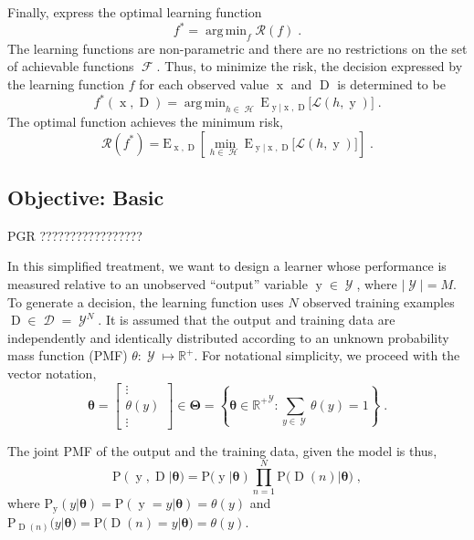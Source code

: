 \documentclass[12pt]{report}
\DeclareMathOperator*{\argmin}{arg\,min}
\DeclareMathOperator{\xrm}{\mathrm{x}}
\DeclareMathOperator{\yrm}{\mathrm{y}}
\DeclareMathOperator{\Drm}{\mathrm{D}}
\DeclareMathOperator{\Ycal}{\mathcal{Y}}
\DeclareMathOperator{\Dcal}{\mathcal{D}}
\DeclareMathOperator{\Hcal}{\mathcal{H}}
\DeclareMathOperator{\Fcal}{\mathcal{F}}
\begin{document}
Finally, express the optimal learning function
\begin{equation}
f^* = \argmin_{f} \mathcal{R}(f) \;.
\end{equation}
The learning functions are non-parametric and there are no restrictions on the set of achievable functions $\Fcal$. Thus, to minimize the risk, the decision expressed by the learning function $f$ for each observed value $\xrm$ and $\Drm$ is determined to be
\begin{equation} \label{f_opt_xD}
f^*(\xrm,\Drm) = \argmin_{h \in \Hcal} \text{E}_{\yrm | \xrm,\Drm}\big[ \mathcal{L}(h,\yrm) \big] \;.
\end{equation}
The optimal function achieves the minimum risk,
\begin{equation} \label{risk_min_IO}
\mathcal{R}(f^*) = \text{E}_{\xrm,\Drm} \left[ \min_{h \in \Hcal} \text{E}_{\yrm | \xrm,\Drm}\big[ \mathcal{L}(h,\yrm) \big] \right] \;.
\end{equation}




\subsection{Objective: Basic}

PGR ?????????????????

In this simplified treatment, we want to design a learner whose performance is measured relative to an unobserved ``output'' variable $\yrm \in \Ycal$, where $|\Ycal| = M$. To generate a decision, the learning function uses $N$ observed training examples $\Drm \in \Dcal = \Ycal^N$. It is assumed that the output and training data are independently and identically distributed according to an unknown probability mass function (PMF) $\theta: \Ycal \mapsto \mathbb{R}^+$. For notational simplicity, we proceed with the vector notation, 
\begin{equation}
\bm{\theta} = \begin{bmatrix} \vdots \\ \theta(y) \\ \vdots \end{bmatrix} \in \bm{\Theta} 
= \left\{ \bm{\theta} \in {\mathbb{R}^+}^{\Ycal}: \sum_{y \in \Ycal} \theta(y) = 1 \right\} \;.
\end{equation}

The joint PMF of the output and the training data, given the model is thus,
\begin{equation}
\text{P}(\yrm,\Drm | \bm{\theta}) = \text{P}(\yrm | \bm{\theta}) \prod_{n=1}^N \text{P}\big( \Drm(n) | \bm{\theta} \big) \;,
\end{equation}
where $\text{P}_{\yrm}(y|\bm{\theta}) = \text{P}(\yrm = y | \bm{\theta}) = \theta(y)$ and $\text{P}_{\Drm(n)}(y|\bm{\theta}) = \text{P}\big( \Drm(n) = y | \bm{\theta} \big) = \theta(y)$.
\end{document}
